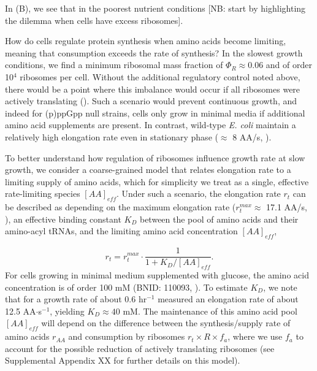 In \FIG{}(B), we see that in the poorest nutrient conditions
[NB: start by highlighting the dilemma when cells have excess ribosomes].

How do cells regulate protein synthesis when amino acids become limiting,
meaning that consumption exceeds the rate of synthesis? In the slowest  growth
conditions, we find a minimum ribosomal mass fraction of $\Phi_R \approx 0.06$
and  of order 10$^4$ ribosomes per cell.   Without the additional regulatory
control noted above, there would be a point where  this imbalance would occur if
all ribosomes were actively translating  (). Such a
scenario would prevent continuous growth, and indeed for (p)ppGpp null strains,
cells only grow in minimal media if additional amino acid supplements are
present. In contrast, wild-type \textit{E. coli} maintain a relatively high
elongation rate even in stationary phase ($\approx$ 8 AA/s, \citep{dai2016,
dai2018}).

To better understand how regulation of ribosomes influence growth rate at
slow growth, we consider a coarse-grained model that relates elongation
rate to a limiting supply of amino acids, which for simplicity we treat as a
single, effective rate-limiting species $[AA]_{eff}$. Under such a scenario, the elongation
rate $r_t$ can be described as depending on the maximum elongation rate ($r_t^{max}
\approx$ 17.1 AA/s, \citep{dai2016, dai2018}), an effective binding constant
$K_D$ between the pool of amino acids and their amino-acyl tRNAs, and the limiting
amino acid concentration $[AA]_{eff}$,

\begin{equation}
r_t = r_t^{max} \cdot \frac{1}{1 + K_D / [AA]_{eff}}.
\label{eq:rate_Kd}
\end{equation}
For cells growing in minimal medium supplemented with glucose, the amino acid
concentration is of order 100 mM (BNID: 110093, \citep{milo2010, bennett2009}).
To estimate  $K_D$, we note that for a growth rate of about 0.6 hr$^{-1}$
\cite{dai2016} measured an elongation rate of about 12.5 AA$\cdot$s$^{-1}$,
yielding $K_D \approx 40$ mM. The maintenance of this amino acid pool
$[AA]_{eff}$ will depend on the difference between the synthesis/supply rate of
amino acids $r_{AA}$ and consumption by ribosomes $r_t \times R \times f_a$,
where we use $f_a$ to account for the possible reduction of actively translating
ribosomes (see Supplemental Appendix XX for further details on this model).

